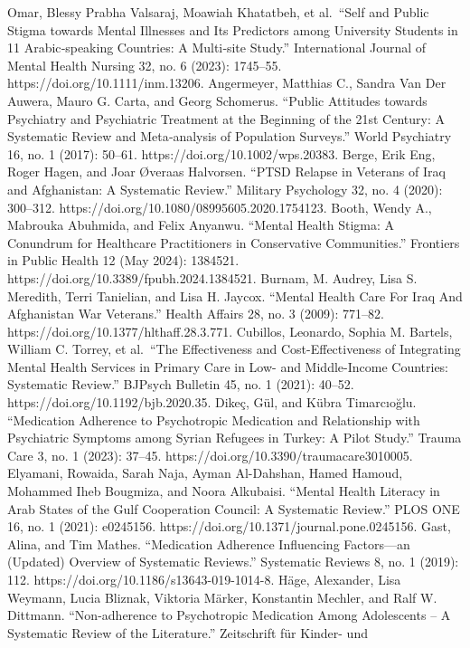 Omar, Blessy Prabha Valsaraj, Moawiah Khatatbeh, et al.~``Self and
Public Stigma towards Mental Illnesses and Its Predictors among
University Students in 11 Arabic‐speaking Countries: A Multi‐site
Study.'' International Journal of Mental Health Nursing 32, no. 6
(2023): 1745--55. https://doi.org/10.1111/inm.13206. Angermeyer,
Matthias C., Sandra Van Der Auwera, Mauro G. Carta, and Georg Schomerus.
``Public Attitudes towards Psychiatry and Psychiatric Treatment at the
Beginning of the 21st Century: A Systematic Review and Meta‐analysis of
Population Surveys.'' World Psychiatry 16, no. 1 (2017): 50--61.
https://doi.org/10.1002/wps.20383. Berge, Erik Eng, Roger Hagen, and
Joar Øveraas Halvorsen. ``PTSD Relapse in Veterans of Iraq and
Afghanistan: A Systematic Review.'' Military Psychology 32, no. 4
(2020): 300--312. https://doi.org/10.1080/08995605.2020.1754123. Booth,
Wendy A., Mabrouka Abuhmida, and Felix Anyanwu. ``Mental Health Stigma:
A Conundrum for Healthcare Practitioners in Conservative Communities.''
Frontiers in Public Health 12 (May 2024): 1384521.
https://doi.org/10.3389/fpubh.2024.1384521. Burnam, M. Audrey, Lisa S.
Meredith, Terri Tanielian, and Lisa H. Jaycox. ``Mental Health Care For
Iraq And Afghanistan War Veterans.'' Health Affairs 28, no. 3 (2009):
771--82. https://doi.org/10.1377/hlthaff.28.3.771. Cubillos, Leonardo,
Sophia M. Bartels, William C. Torrey, et al.~``The Effectiveness and
Cost-Effectiveness of Integrating Mental Health Services in Primary Care
in Low- and Middle-Income Countries: Systematic Review.'' BJPsych
Bulletin 45, no. 1 (2021): 40--52. https://doi.org/10.1192/bjb.2020.35.
Dikeç, Gül, and Kübra Timarcıoğlu. ``Medication Adherence to
Psychotropic Medication and Relationship with Psychiatric Symptoms among
Syrian Refugees in Turkey: A Pilot Study.'' Trauma Care 3, no. 1 (2023):
37--45. https://doi.org/10.3390/traumacare3010005. Elyamani, Rowaida,
Sarah Naja, Ayman Al-Dahshan, Hamed Hamoud, Mohammed Iheb Bougmiza, and
Noora Alkubaisi. ``Mental Health Literacy in Arab States of the Gulf
Cooperation Council: A Systematic Review.'' PLOS ONE 16, no. 1 (2021):
e0245156. https://doi.org/10.1371/journal.pone.0245156. Gast, Alina, and
Tim Mathes. ``Medication Adherence Influencing Factors---an (Updated)
Overview of Systematic Reviews.'' Systematic Reviews 8, no. 1 (2019):
112. https://doi.org/10.1186/s13643-019-1014-8. Häge, Alexander, Lisa
Weymann, Lucia Bliznak, Viktoria Märker, Konstantin Mechler, and Ralf W.
Dittmann. ``Non-adherence to Psychotropic Medication Among Adolescents
-- A Systematic Review of the Literature.'' Zeitschrift für Kinder- und
